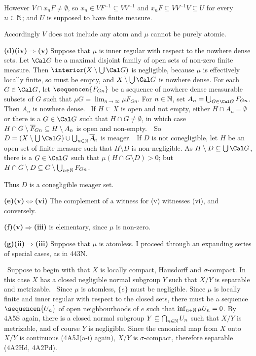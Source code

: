 {

\noindent However $V\cap x_nF\ne\emptyset$, so
$x_n\in VF^{-1}\subseteq VV^{-1}$ and $x_nF\subseteq VV^{-1}V\subseteq U$
for every $n\in\Bbb N$;  and $U$ is supposed to have finite measure.\ \Bang

Accordingly $V$ does not include any atom and $\mu$ cannot be purely
atomic.

\medskip

{\bf (d)(iv)$\Rightarrow$(v)} Suppose that $\mu$ is inner regular with
respect to the nowhere dense sets.   Let $\Cal G$ be a maximal disjoint
family of open sets of non-zero finite measure.   Then
$\interior(X\setminus\bigcup\Cal G)$ is negligible, because $\mu$ is
effectively locally finite, so must be empty, and
$X\setminus\bigcup\Cal G$ is nowhere dense.   For each $G\in\Cal G$, let
$\sequencen{F_{Gn}}$ be a sequence of nowhere dense measurable
subsets of $G$ such that $\mu G=\lim_{n\to\infty}\mu F_{Gn}$.   For
$n\in\Bbb N$, set $A_n=\bigcup_{G\in\Cal G}F_{Gn}$.   Then $A_n$ is nowhere
dense.   \Prf\ If $H\subseteq X$ is open and not empty, either
$H\cap A_n=\emptyset$ or there is a $G\in\Cal G$ such that
$H\cap G\ne\emptyset$, in which case
$H\cap G\setminus\overline{F}_{\mskip-3mu Gn}\subseteq H\setminus A_n$
is open and non-empty.\ \QeD\   So
$D=(X\setminus\bigcup\Cal G)
  \cup\bigcup_{n\in\Bbb N}\overline{A}_{\mskip-3mu n}$ is
meager.   \Quer\ If $D$ is not conegligible, let $H$ be an open set of
finite measure such that $H\setminus D$ is non-negligible.   As
$H\setminus D\subseteq\bigcup\Cal G$, there is a $G\in\Cal G$ such that
$\mu(H\cap G\setminus D)>0$;  but
$H\cap G\setminus D\subseteq G\setminus\bigcup_{n\in\Bbb N}F_{Gn}$.\ \Bang

Thus $D$ is a conegligible meager set.

\medskip

{\bf (e)(v)$\Leftrightarrow$(vi)} The complement of a witness for (v)
witnesses (vi), and conversely.

\medskip

{\bf (f)(v)$\Rightarrow$(iii)} is elementary, since $\mu$ is non-zero.

\medskip

{\bf (g)(ii)$\Rightarrow$(iii)} Suppose that $\mu$ is atomless.
I proceed through an expanding series of special cases,
as in 443N.

\medskip

\quad\grheada\ Suppose to begin with that
$X$ is locally compact, Hausdorff and
$\sigma$-compact.   In this case $X$ has a closed negligible normal
subgroup $Y$ such that $X/Y$ is separable and metrizable.   \Prf\ Since
$\mu$ is atomless, $\{e\}$ must be negligible.   Since $\mu$ is locally
finite and inner regular with respect to the closed sets,
there must be a sequence $\sequencen{U_n}$ of open neighbourhoods of $e$
such that $\inf_{n\in\Bbb N}\mu U_n=0$.   By 4A5S again,
there is a closed normal
subgroup $Y\subseteq\bigcap_{n\in\Bbb N}U_n$ such that $X/Y$ is metrizable,
and of course $Y$ is negligible.   Since the canonical map from $X$ onto
$X/Y$ is continuous (4A5J(a-i) again),
$X/Y$ is $\sigma$-compact, therefore separable (4A2Hd, 4A2Pd).\ \Qed

}
